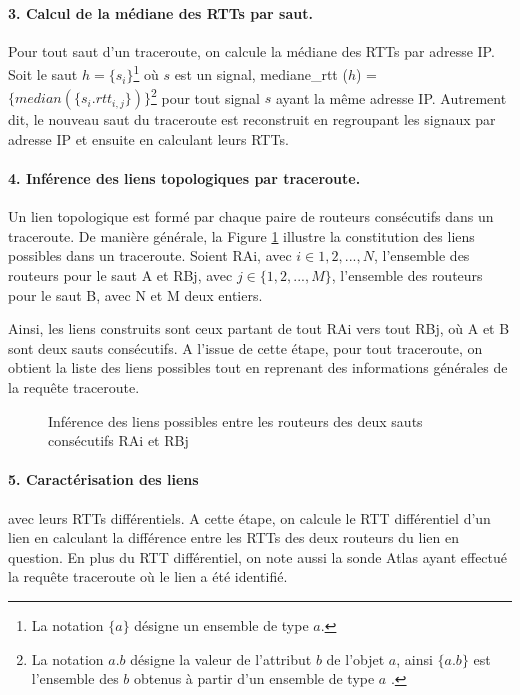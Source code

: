 \paragraph{3. Calcul de la médiane des RTTs par saut.} Pour tout saut d'un traceroute,  on calcule la médiane des RTTs par adresse IP. Soit le saut $h =\{s_i \}$\footnote{La notation $\{ a\}$ désigne un ensemble de type $a$.} où $s$ est un  signal, mediane\_rtt ($h$) =  $\{median(\{s_i.rtt_{i, j}\})\}$\footnote{La notation $a.b$ désigne la valeur de l'attribut $b$ de l'objet $a$, ainsi $\{a.b\}$ est l'ensemble des $b$ obtenus à partir d'un ensemble de type $a$ .}  pour tout signal $s$ ayant la même adresse IP. Autrement dit, le nouveau saut du traceroute est reconstruit en regroupant les signaux par adresse IP et ensuite en calculant leurs RTTs. 




\paragraph{4. Inférence des liens topologiques par traceroute.} Un lien topologique est formé par chaque paire de routeurs consécutifs dans un traceroute. De manière générale, la Figure \ref{fig:link-inference} illustre la constitution des liens possibles  dans un traceroute. Soient  RAi, avec $i \in {1,2, ...,N}$,  l'ensemble des routeurs pour le saut A et RBj, avec $j \in \{1,2, ..., M\}$, l'ensemble  des routeurs pour le saut B, avec N et M deux entiers.



Ainsi, les liens  construits sont ceux partant de tout RAi vers tout RBj, où A et B sont deux sauts consécutifs. A l'issue de cette étape, pour tout traceroute, on obtient la liste des liens possibles tout en reprenant des informations générales de la requête traceroute.
\begin{figure}[H]
	\centering
	\captionsetup{justification=centering}
	
	\caption{Inférence des liens possibles entre les routeurs des deux sauts consécutifs RAi et RBj}
	\label{fig:link-inference}
\end{figure}
\paragraph{5. Caractérisation des liens} avec leurs RTTs différentiels. A cette étape, on calcule le RTT différentiel d'un lien en calculant la différence entre les RTTs des deux routeurs du lien en question. En plus du RTT différentiel, on note aussi la sonde Atlas ayant effectué la requête traceroute où le lien a été identifié. 

